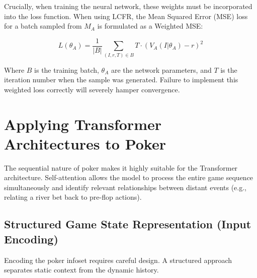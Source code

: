 \documentclass[11pt,a4paper]{article}
\begin{document}
Crucially, when training the neural network, these weights must be incorporated into the loss function. When using LCFR, the Mean Squared Error (MSE) loss for a batch sampled from $M_A$ is formulated as a Weighted MSE:

\begin{equation}
L(\theta_A) = \frac{1}{|B|} \sum_{(I, r, T) \in B} T \cdot (V_A(I|\theta_A) - r)^2
\end{equation}

Where $B$ is the training batch, $\theta_A$ are the network parameters, and $T$ is the iteration number when the sample was generated. Failure to implement this weighted loss correctly will severely hamper convergence.

\section{Applying Transformer Architectures to Poker}

The sequential nature of poker makes it highly suitable for the Transformer architecture. Self-attention allows the model to process the entire game sequence simultaneously and identify relevant relationships between distant events (e.g., relating a river bet back to pre-flop actions).

\subsection{Structured Game State Representation (Input Encoding)}

Encoding the poker infoset requires careful design. A structured approach separates static context from the dynamic history.
\end{document}
